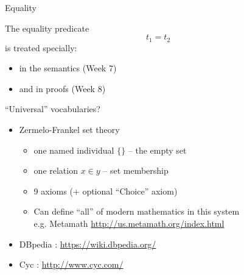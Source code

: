 \documentclass[xetex,aspectratio=169,14pt,hyperref={pdfpagelabels=true,pdflang={en-GB}}]{beamer}
\begin{document}
\begin{frame}
  {Equality}

  The equality predicate
  \begin{displaymath}
    t_1 = t_2
  \end{displaymath}
  is treated specially:
  \begin{itemize}
  \item in the semantics (Week 7)
  \item and in proofs (Week 8)
  \end{itemize}
\end{frame}

\begin{frame}[t]
  {``Universal'' vocabularies?}

  \bigskip

  \begin{itemize}
  \item Zermelo-Frankel set theory
    \begin{itemize}
    \item one named individual $\{\}$ -- the empty set
    \item one relation $x \in y$ -- set membership
    \item 9 axioms (+ optional ``Choice'' axiom)
    \item Can define ``all'' of modern mathematics in this system \\
      e.g. Metamath \url{http://us.metamath.org/index.html}
    \end{itemize}

    \bigskip
  \item DBpedia : \url{https://wiki.dbpedia.org/} \\

    \bigskip
  \item Cyc : \url{http://www.cyc.com/} \\
  \end{itemize}
\end{frame}
\end{document}
